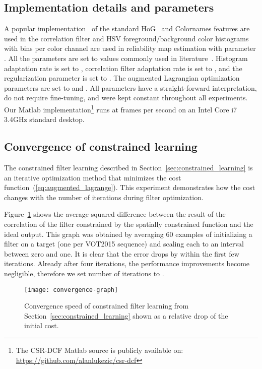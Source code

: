 \documentclass[twocolumn]{article}
\begin{document}
\subsection{Implementation details and parameters} \label{sec:implementation_details}

A popular implementation~\cite{felzenszwalb_dpm} of the standard HoG~\citep{dalal_triggs_hog} and Colornames \citep{colornames_tip2009} features are used in the correlation filter and HSV foreground/background color histograms with  bins per color channel are used in reliability map estimation with parameter . All the parameters are set to values commonly used in literature~\citep{srdcf_iccv2015,cfwlb_cvpr2015}. Histogram adaptation rate is set to , correlation filter adaptation rate is set to , and the regularization parameter is set to . The augmented Lagrangian optimization parameters are set to  and . All parameters have a straight-forward interpretation, do not require fine-tuning, and were kept constant throughout all experiments.
Our Matlab implementation\footnote{The CSR-DCF Matlab source is publicly available on: \\ \url{https://github.com/alanlukezic/csr-dcf}} runs at  frames per second on an Intel Core i7 3.4GHz standard desktop.

\subsection{Convergence of constrained learning} \label{sec:convergence_exp}

The constrained filter learning described in Section~\ref{sec:constrained_learning} is an iterative optimization method that minimizes the cost function~(\ref{eq:augmented_lagrange}). This experiment demonstrates how the cost changes with the number of iterations during filter optimization.

Figure~\ref{fig:convergence} shows the average squared difference between the result of the correlation of the filter constrained by the spatially constrained function and the ideal output. This graph was obtained by averaging 60 examples of initializing a filter on a target (one per VOT2015 sequence) and scaling each to an interval between zero and one. It is clear that the error drops by  within the first few iterations. Already after four iterations, the performance improvements become negligible, therefore we set number of iterations to .


\begin{figure}[!ht]
\centering
\texttt{[image: convergence-graph]}
\caption{Convergence speed of constrained filter learning from Section~\ref{sec:constrained_learning} shown as a relative drop of the initial cost.}
\label{fig:convergence}
\end{figure}
\end{document}
